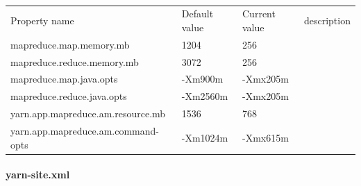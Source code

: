 \documentclass[12pt,english]{book}
\begin{document}
\begin{table}[H]
\begin{tabular}{llll}
\rowcolor[HTML]{4472C4} 
{\color[HTML]{FFFFFF} Property name} & {\color[HTML]{FFFFFF} Default value} & {\color[HTML]{FFFFFF} Current value} & {\color[HTML]{FFFFFF} description} \\
\rowcolor[HTML]{D9E2F3} 
mapreduce.map.memory.mb                 & 1204                                     & 256                                    &                                    \\
mapreduce.reduce.memory.mb              & 3072                                     & 256                                    &                                    \\
\rowcolor[HTML]{D9E2F3} 
mapreduce.map.java.opts                 & -Xm900m                                  & -Xmx205m                               &                                    \\
mapreduce.reduce.java.opts              & -Xm2560m                                 & -Xmx205m                               &                                    \\
\rowcolor[HTML]{D9E2F3} 
yarn.app.mapreduce.am.resource.mb       & 1536                                     & 768                                    &                                    \\
yarn.app.mapreduce.am.command-opts      & -Xm1024m                                 & -Xmx615m                               &                                   
\end{tabular}
\caption{}
\end{table}

\paragraph{yarn-site.xml}\mbox{}\\
\end{document}
